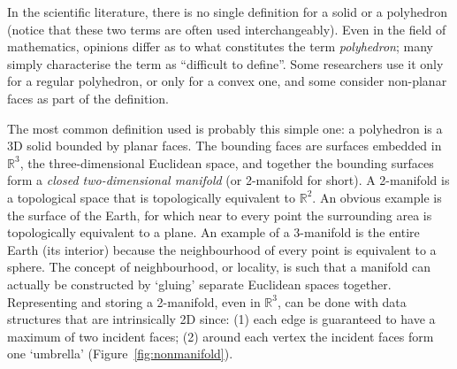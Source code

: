 In the scientific literature, there is no single definition for a solid or a polyhedron (notice that these two terms are often used interchangeably).
Even in the field of mathematics, opinions differ as to what constitutes the term \emph{polyhedron}; many simply characterise the term as ``difficult to define''. 
Some researchers use it only for a regular polyhedron, or only for a convex one, and some consider non-planar faces as part of the definition.

%

The most common definition used is probably this simple one: a polyhedron is a 3D solid bounded by planar faces. 
The bounding faces are surfaces embedded in $\mathbb{R}^3$, the three-dimen\-si\-o\-nal Euclidean space, and together the bounding surfaces form a \emph{closed two-dimensional manifold} (or 2-manifold for short).
A 2-manifold is a topological space that is topologically equivalent to $\mathbb{R}^2$. 
An obvious example is the surface of the Earth, for which near to every point the surrounding area is topologically equivalent to a plane. 
An example of a 3-manifold is the entire Earth (its interior) because the neighbourhood of every point is equivalent to a sphere. 
The concept of neighbourhood, or locality, is such that a manifold can actually be constructed by `gluing' separate Euclidean spaces together.
Representing and storing a 2-manifold, even in $\mathbb{R}^3$, can be done with data structures that are intrinsically 2D since: (1) each edge is guaranteed to have a maximum of two incident faces; (2) around each vertex the incident faces form one `umbrella' (Figure~\ref{fig:nonmanifold}).
